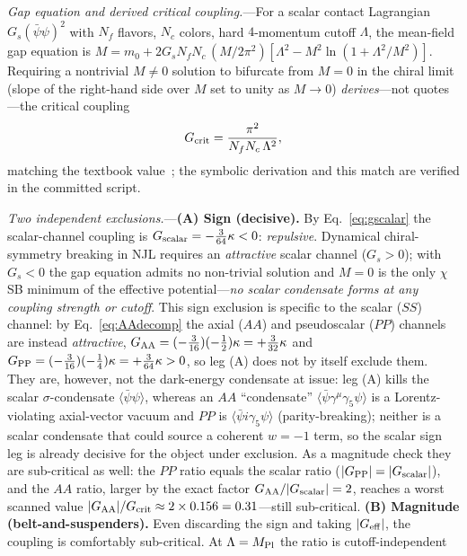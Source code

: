 \documentclass[aps,prd,twocolumn,superscriptaddress,showpacs,preprintnumbers,nofootinbib,longbibliography,floatfix]{revtex4-2}
\begin{document}
\emph{Gap equation and derived critical coupling.}---For a scalar contact
Lagrangian $G_s(\bar\psi\psi)^2$ with $N_f$ flavors, $N_c$ colors, hard
$4$-momentum cutoff $\Lambda$, the mean-field gap equation is
$M=m_0+2G_s N_f N_c\,(M/2\pi^2)[\Lambda^2-M^2\ln(1+\Lambda^2/M^2)]$.
Requiring a nontrivial $M\neq0$ solution to bifurcate from $M=0$ in the
chiral limit (slope of the right-hand side over $M$ set to unity as
$M\to0$) \emph{derives}---not quotes---the critical coupling
\begin{equation}\label{eq:gcrit}
G_{\rm crit}=\frac{\pi^2}{N_f N_c\,\Lambda^2},
\end{equation}
matching the textbook value~\cite{Klevansky1992,Buballa2005}; the symbolic
derivation and this match are verified in the committed script.

\emph{Two independent exclusions.}---\textbf{(A) Sign (decisive).} By
Eq.~\eqref{eq:gscalar} the scalar-channel coupling is
$G_{\rm scalar}=-\tfrac{3}{64}\kappa<0$: \emph{repulsive}. Dynamical
chiral-symmetry breaking in NJL requires an \emph{attractive} scalar channel
($G_s>0$); with $G_s<0$ the gap equation admits no non-trivial solution and
$M=0$ is the only $\chi$SB minimum of the effective potential---\emph{no
scalar condensate forms at any coupling strength or cutoff}. This sign
exclusion is specific to the scalar ($SS$) channel: by
Eq.~\eqref{eq:AAdecomp} the axial ($AA$) and pseudoscalar ($PP$) channels are
instead \emph{attractive}, $G_{\rm AA}=(-\tfrac{3}{16})(-\tfrac12)\kappa
=+\tfrac{3}{32}\kappa$ and $G_{\rm PP}=(-\tfrac{3}{16})(-\tfrac14)\kappa
=+\tfrac{3}{64}\kappa>0$, so leg (A) does not by itself exclude them. They are,
however, not the dark-energy condensate at issue: leg (A) kills the scalar
$\sigma$-condensate $\langle\bar\psi\psi\rangle$, whereas an $AA$ ``condensate''
$\langle\bar\psi\gamma^\mu\gamma_5\psi\rangle$ is a Lorentz-violating
axial-vector vacuum and $PP$ is $\langle\bar\psi i\gamma_5\psi\rangle$
(parity-breaking); neither is a scalar condensate that could source a coherent
$w=-1$ term, so the scalar sign leg is already decisive for the object under
exclusion. As a magnitude check they are sub-critical as well: the $PP$ ratio
equals the scalar ratio ($|G_{\rm PP}|=|G_{\rm scalar}|$), and the $AA$ ratio,
larger by the exact factor $G_{\rm AA}/|G_{\rm scalar}|=2$, reaches a worst
scanned value $|G_{\rm AA}|/G_{\rm crit}\approx 2\times0.156=0.31$---still
sub-critical. \textbf{(B) Magnitude (belt-and-suspenders).}
Even discarding the sign and taking $|G_{\rm eff}|$, the coupling is comfortably
sub-critical. At $\Lambda=M_{\rm Pl}$ the ratio is cutoff-independent
\end{document}
